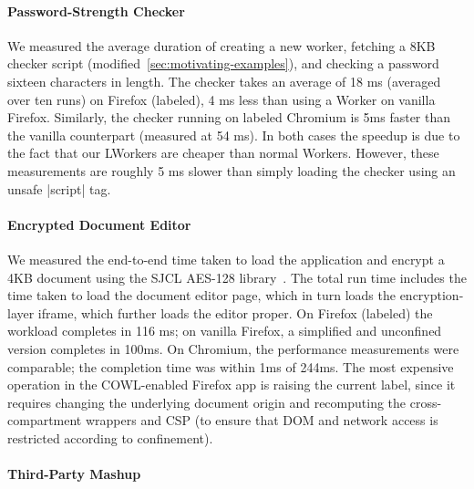 \paragraph{Password-Strength Checker}
%
%
We measured the average duration of creating a new worker, fetching a
8KB checker script (modified~\ref{sec:motivating-examples}), and
checking a password sixteen characters in length.
%
The checker takes an average of 18 ms (averaged over ten runs) on
Firefox (labeled), 4 ms less than using a Worker on vanilla Firefox.
%
Similarly, the checker running on labeled Chromium is 5ms faster than
the vanilla counterpart (measured at 54 ms).
%
In both cases the speedup is due to the fact that our LWorkers are
cheaper than normal Workers.
%
However, these measurements are roughly 5 ms slower than simply loading
the checker using an unsafe \js|script| tag.

\paragraph{Encrypted Document Editor}

%
We measured the end-to-end time taken to load the application and
encrypt a 4KB document using the SJCL AES-128 library~\cite{sjcl}.
%
The total run time includes the time taken to load the document editor
page, which in turn loads the encryption-layer iframe, which further
loads the editor proper.
%
On Firefox (labeled) the workload completes in 116 ms;  on vanilla
Firefox, a simplified and unconfined version completes in 100ms.
%
On Chromium, the performance measurements were comparable; the
completion time was within 1ms of 244ms.
%
The most expensive operation in the COWL-enabled Firefox app is
raising the current label, since it requires changing the underlying
document origin and recomputing the cross-compartment wrappers and CSP
(to ensure that DOM and network access is restricted according to
confinement).


\paragraph{Third-Party Mashup}

